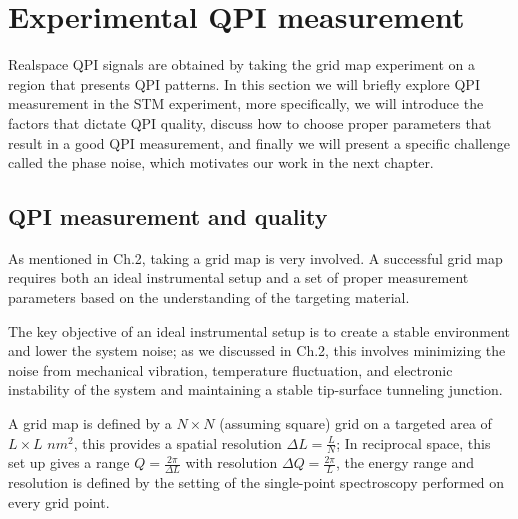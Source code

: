 \section{Experimental QPI measurement}
Realspace \ac{QPI} signals are obtained by taking the grid map experiment on a region that presents \ac{QPI} patterns. In this section we will briefly explore \ac{QPI} measurement in the \ac{STM} experiment, more specifically, we will introduce the factors that dictate \ac{QPI} quality, discuss how to choose proper parameters that result in a good \ac{QPI} measurement, and finally we will present a specific challenge called the phase noise, which motivates our work in the next chapter.


\subsection{QPI measurement and quality}
As mentioned in Ch.2, taking a grid map is very involved. A successful grid map requires both an ideal instrumental setup and a set of proper measurement parameters based on the understanding of the targeting material. 

The key objective of an ideal instrumental setup is to create a stable environment and lower the system noise; as we discussed in Ch.2, this involves minimizing the noise from mechanical vibration, temperature fluctuation, and electronic instability of the system and maintaining a stable tip-surface tunneling junction. 

A grid map is defined by a $N\times N$ (assuming square) grid on a targeted area of $L \times L$ $nm^2$, this provides a spatial resolution $\Delta L = \frac{L}{N}$; In reciprocal space, this set up gives a range $Q = \frac{2 \pi}{\Delta L}$ with resolution $\Delta Q = \frac{2\pi}{L}$, the energy range and resolution is defined by the setting of the single-point spectroscopy performed on every grid point. 

